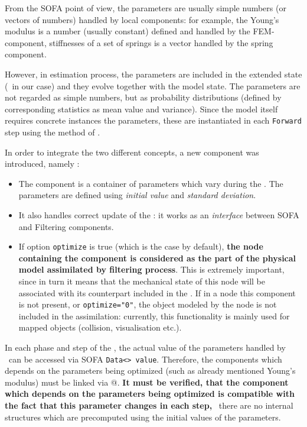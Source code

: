 \documentclass[10pt]{article}
\begin{document}
From the SOFA point of view, the parameters are usually simple numbers (or vectors of numbers) handled by local components: for example, the Young's
modulus is a number (usually constant) defined and handled by the FEM-component, stiffnesses of a set of springs is a vector handled by the spring
component. 

However, in estimation process, the parameters are included in the extended  state (\sstate\ in our case) and they evolve together with the model
state. The parameters are not regarded as simple numbers, 
but as probability distributions (defined by corresponding statistics as mean value and variance). Since the model itself requires concrete instances
the parameters, these are instantiated in each \texttt{Forward} step using the method of \smp.

In order to integrate the two different concepts, a new component was introduced, namely \opr:
\begin{itemize}
\item The component is a container of parameters which vary during the \ssda. The parameters are defined using \emph{initial value} and \emph{standard
deviation}.
\item It also handles correct update of the \sstate: it works as an \emph{interface} between SOFA and Filtering components. 
\item If option \texttt{optimize} is true (which is the case by default), \textbf{the node containing the component is considered as the part of the
physical model assimilated by filtering process}. This is extremely important, since in turn it means that the mechanical state of
this node will be associated with its counterpart included in the \sstate. If in a node this component is not present, or \texttt{optimize="0"}, 
the object modeled by the node is not included in the assimilation: currently, this functionality is mainly used for mapped objects
(collision, visualisation etc.). 
\end{itemize}
In each phase and step of the \ssda, the actual value of the parameters handled by \opr\ can be accessed via SOFA \texttt{Data<> value}. Therefore,
the components which depends on the parameters being optimized (such as already mentioned Young's modulus) must be linked via @. \textbf{It must be
verified, that the component which depends on the parameters being optimized is compatible with the fact that this parameter changes in each step,}
\ie\ there are no internal structures which are precomputed using the initial values of the parameters. 
\end{document}
